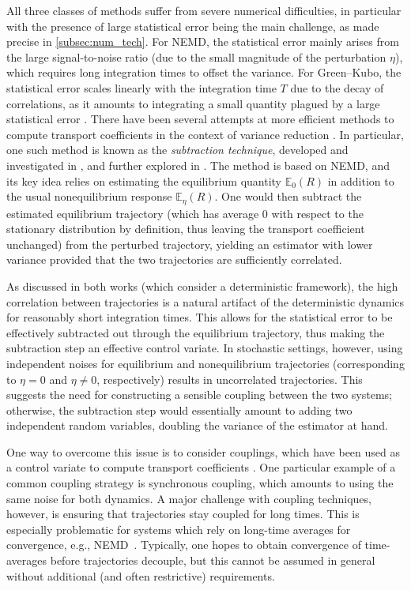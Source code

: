 \documentclass[11pt]{article}
\newcommand{\E}{\mathbb{E}}
\theoremstyle{definition}
\begin{document}
All three classes of methods suffer from severe numerical difficulties, in particular with the presence of large statistical error being the main challenge, as made precise in \cref{subsec:num_tech}. For NEMD, the statistical error mainly arises from the large signal-to-noise ratio (due to the small magnitude of the perturbation $\eta$), which requires long integration times to offset the variance. For Green--Kubo, the statistical error scales linearly with the integration time $T$ due to the decay of correlations, as it amounts to integrating a small quantity plagued by a large statistical error \cite{sousaoliveira2017}. There have been several attempts at more efficient methods to compute transport coefficients in the context of variance reduction \cite{pavliotis2023,spacek2023,blassel2024}. In particular, one such method is known as the \emph{subtraction technique}, developed and investigated in \cite{ciccotti1975}, and further explored in \cite{ciccotti1979}. The method is based on NEMD, and its key idea relies on estimating the equilibrium quantity $\E_0(R)$ in addition to the usual nonequilibrium response $\E_\eta(R)$. One would then subtract the estimated equilibrium trajectory (which has average 0 with respect to the stationary distribution by definition, thus leaving the transport coefficient unchanged) from the perturbed trajectory, yielding an estimator with lower variance provided that the two trajectories are sufficiently correlated.

As discussed in both works \cite{ciccotti1975,ciccotti1979} (which consider a deterministic framework), the high correlation between trajectories is a natural artifact of the deterministic dynamics for reasonably short integration times. This allows for the statistical error to be effectively subtracted out through the equilibrium trajectory, thus making the subtraction step an effective control variate. In stochastic settings, however, using independent noises for equilibrium and nonequilibrium trajectories (corresponding to $\eta=0$ and $\eta\ne 0$, respectively) results in uncorrelated trajectories. This suggests the need for constructing a sensible coupling between the two systems; otherwise, the subtraction step would essentially amount to adding two independent random variables, doubling the variance of the estimator at hand. 

One way to overcome this issue is to consider couplings, which have been used as a control variate to compute transport coefficients \cite{goodman2009,garnier2022}. One particular example of a common coupling strategy is synchronous coupling, which amounts to using the same noise for both dynamics. A major challenge with coupling techniques, however, is ensuring that trajectories stay coupled for long times.
This is especially problematic for systems which rely on long-time averages for convergence, e.g., NEMD~\cite{darshan2024}. Typically, one hopes to obtain convergence of time-averages before trajectories decouple, but this cannot be assumed in general without additional (and often restrictive) requirements.
\end{document}

